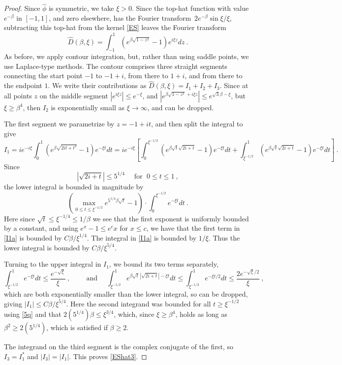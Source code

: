 \documentclass[10pt]{article}
\newcommand{\be}{\begin{equation}}
\newcommand{\ee}{\end{equation}}
\newcommand{\freq}{\beta}          %
\newcommand{\FT}{Fourier transform}
\begin{document}
\begin{proof}
  Since $\hat\phi$ is symmetric, we take $\xi>0$.
  Since the top-hat function with value $e^{-\freq}$ in $[-1,1]$, and zero
  elsewhere, has the \FT\ $2e^{-\beta} \sin \xi / \xi$,
  subtracting this top-hat from the kernel \eqref{ES} leaves the \FT\
  $$
  \hat D(\freq,\xi) = \int_{-1}^1 (e^{\freq \sqrt{1-z^2}} - 1) e^{i\xi z} dz~.
  $$
  As before, we apply contour integration,
  but, rather than using saddle points, we use Laplace-type methods.
  The contour comprises three straight segments connecting the start
  point $-1$ to $-1+i$, from there to $1+i$, and from there to the endpoint $1$.
  We write their contributions as $\hat D(\freq,\xi) = I_1+I_2+I_3$.
  Since at all points $z$ on the middle segment
  $|e^{i\xi z}|\le e^{-\xi}$, and 
  $|e^{\freq \sqrt{1-z^2} +i\xi z}| \le e^{\sqrt{3} \freq - \xi}$, 
  but $\xi\ge \freq^4$,
  then $I_2$ is exponentially small as $\xi\to\infty$,
  and can be dropped.
  
  The first segment we parametrize by $z=-1+it$, and then split the integral
  to give
  $$
  I_1 = i e^{-i\xi} \int_{0}^1 (e^{\freq \sqrt{2it + t^2}} - 1)e^{-\xi t} dt
  = i e^{-i\xi} \left[ \int_{0}^{\xi^{-1/2}} (e^{\freq \sqrt{t} \sqrt{2i + t}} - 1)e^{-\xi t} dt
    + \int_{\xi^{-1/2}}^1 (e^{\freq \sqrt{t} \sqrt{2i + t}} - 1)e^{-\xi t}  dt \right]
  ~.
$$
  Since
  \be
  |\sqrt{2i+t}|\le 5^{1/4} \quad  \mbox{ for } \; 0\le t\le1 ~,
  \label{5q}
  \ee
  the lower integral is bounded in magnitude by
  \be
  \left(\max_{0\le t \le \xi^{-1/2}} e^{5^{1/4}\freq \sqrt{t}} - 1 \right) \cdot
  \int_{0}^{\xi^{-1/2}} e^{-\xi t} dt~.
  \label{I1a}
  \ee
  Here since $\sqrt{t}\le \xi^{-1/4} \le 1/\freq$ we see that the first exponent
  is uniformly bounded by a constant, and using $e^x-1 \le e^c x$ for $x\le c$,
  we have that the first term in \eqref{I1a} is bounded by $C\freq/\xi^{1/4}$.
  The integral in \eqref{I1a} is bounded by $1/\xi$.
  Thus the lower integral is bounded by $C\freq/\xi^{5/4}$.

  Turning to the upper integral in $I_1$, we bound its two terms
  separately, 
  $$
  \int_{\xi^{-1/2}}^1 e^{-\xi t}  dt \le \frac{e^{-\sqrt{\xi}}}{\xi}~,
  \qquad\mbox{ and } \quad
  \int_{\xi^{-1/2}}^1 e^{\freq \sqrt{t}\, |\sqrt{2i + t}| - \xi t} dt
  \le
  \int_{\xi^{-1/2}}^1 e^{-\xi t/2}  dt \le \frac{2e^{-\sqrt{\xi}/2}}{\xi}~,
  $$
  which are both exponentially smaller than the lower integral,
  so can be dropped, giving $|I_1| \le C\freq/\xi^{5/4}$.
  Here the second integrand was bounded for all $t \ge \xi^{-1/2}$ using
  \eqref{5q} and that $2(5^{1/4}) \freq \le \xi^{3/4}$,
  which, since $\xi\ge\freq^4$, holds as long as
  $\freq^2 \ge 2(5^{1/4})$, which is satisfied if $\freq\ge 2$.
  
  The integrand on the third segment is the complex conjugate of the first,
  so $I_3 = I_1^\ast$ and $|I_3| = |I_1|$. This proves \eqref{EShat3}.
\end{proof}
\end{document}
